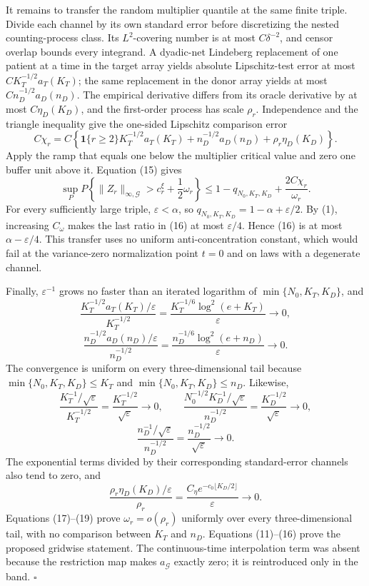 It remains to transfer the random multiplier quantile at the same finite triple. Divide each channel by its own standard error before discretizing the nested counting-process class. Its \(L^2\)-covering number is at most \(C\delta^{-2}\), and censor overlap bounds every integrand. A dyadic-net Lindeberg replacement of one patient at a time in the target array yields absolute Lipschitz-test error at most \(CK_T^{-1/2}a_T(K_T)\); the same replacement in the donor array yields at most \(Cn_D^{-1/2}a_D(n_D)\). The empirical derivative differs from its oracle derivative by at most \(C\eta_D(K_D)\), and the first-order process has scale \(\rho_r\). Independence and the triangle inequality give the one-sided Lipschitz comparison error
\[
 C\chi_r=C\left\{\mathbf 1\{r\ge2\}K_T^{-1/2}a_T(K_T)
 +n_D^{-1/2}a_D(n_D)+\rho_r\eta_D(K_D)\right\}. \tag{15}
\]
Apply the ramp that equals one below the multiplier critical value and zero one buffer unit above it. Equation (15) gives
\[
 \sup_P P\!\left\{\|Z_r\|_{\infty,\mathcal G}>c_r^\xi+\frac12\omega_r\right\}
 \le1-q_{N_0,K_T,K_D}+\frac{2C\chi_r}{\omega_r}. \tag{16}
\]
For every sufficiently large triple, \(\varepsilon<\alpha\), so \(q_{N_0,K_T,K_D}=1-\alpha+\varepsilon/2\). By (1), increasing \(C_\omega\) makes the last ratio in (16) at most \(\varepsilon/4\). Hence (16) is at most \(\alpha-\varepsilon/4\). This transfer uses no uniform anti-concentration constant, which would fail at the variance-zero normalization point \(t=0\) and on laws with a degenerate channel.

Finally, \(\varepsilon^{-1}\) grows no faster than an iterated logarithm of \(\min\{N_0,K_T,K_D\}\), and
\[
 \frac{K_T^{-1/2}a_T(K_T)/\varepsilon}{K_T^{-1/2}}
 =\frac{K_T^{-1/6}\log^2(e+K_T)}{\varepsilon}\longrightarrow0,
\]
\[
 \frac{n_D^{-1/2}a_D(n_D)/\varepsilon}{n_D^{-1/2}}
 =\frac{n_D^{-1/6}\log^2(e+n_D)}{\varepsilon}\longrightarrow0. \tag{17}
\]
The convergence is uniform on every three-dimensional tail because \(\min\{N_0,K_T,K_D\}\le K_T\) and \(\min\{N_0,K_T,K_D\}\le n_D\). Likewise,
\[
 \frac{K_T^{-1}/\sqrt\varepsilon}{K_T^{-1/2}}
 =\frac{K_T^{-1/2}}{\sqrt\varepsilon}\to0,
 \qquad
 \frac{N_0^{-1/2}K_D^{-1}/\sqrt\varepsilon}{n_D^{-1/2}}
 =\frac{K_D^{-1/2}}{\sqrt\varepsilon}\to0,
\]
\[
 \frac{n_D^{-1}/\sqrt\varepsilon}{n_D^{-1/2}}
 =\frac{n_D^{-1/2}}{\sqrt\varepsilon}\to0. \tag{18}
\]
The exponential terms divided by their corresponding standard-error channels also tend to zero, and
\[
 \frac{\rho_r\eta_D(K_D)/\varepsilon}{\rho_r}
 =\frac{C_\eta e^{-c_0\lfloor K_D/2\rfloor}}{\varepsilon}\to0. \tag{19}
\]
Equations (17)--(19) prove \(\omega_r=o(\rho_r)\) uniformly over every three-dimensional tail, with no comparison between \(K_T\) and \(n_D\). Equations (11)--(16) prove the proposed gridwise statement. The continuous-time interpolation term was absent because the restriction map makes \(a_{\mathcal G}\) exactly zero; it is reintroduced only in the band. \(\square\)